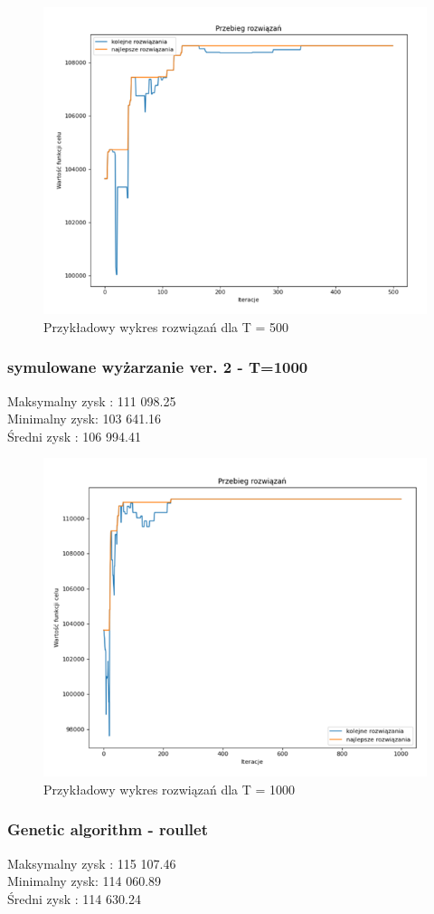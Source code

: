 \documentclass{article}
\begin{document}
\begin{figure}[H]
	\centering
	\includegraphics[width=0.7\linewidth]{screens/AnneallingV2_500}
	\caption{Przykładowy wykres rozwiązań dla T = 500}
	\label{fig:anneallingv2500}
\end{figure}


\subsubsection{symulowane wyżarzanie ver. 2 - T=1000}
Maksymalny zysk : 111 098.25 \\
Minimalny zysk: 103 641.16 \\
Średni zysk : 106 994.41 \\

\begin{figure}[H]
	\centering
	\includegraphics[width=0.7\linewidth]{screens/AnneallingV2_1000}
	\caption{Przykładowy wykres rozwiązań dla T = 1000}
	\label{fig:anneallingv21000}
\end{figure}

\subsubsection{Genetic algorithm - roullet}
Maksymalny zysk : 115 107.46 \\
Minimalny zysk: 114 060.89 \\
Średni zysk : 114 630.24
\end{document}
